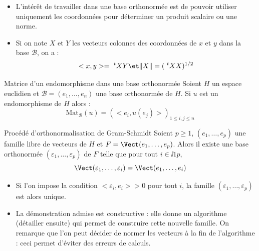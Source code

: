 \documentclass[french,11pt,twoside]{VcCours}
\begin{document}
\begin{Demonstration}{}
\vspace{4cm}
\end{Demonstration}

\begin{Remarques}{}
\begin{itemize} 
\item L'intérêt de travailler dans une base orthonormée est de pouvoir utiliser uniquement les coordonnées pour déterminer un produit scalaire ou une norme.
\item Si on note $X$ et $Y$ les vecteurs colonnes des coordonnées de $x$ et $y$ dans la base $\mathcal{B}$, on a :
$$ <x,y> = ~^tXY \et \Vert X \Vert = (~^tXX)^{1/2}$$
\end{itemize}
\end{Remarques}

\begin{Proposition}{Matrice d'un endomorphisme dans une base orthonormée}
Soient $H$ un espace euclidien et $\mathcal{B}=(e_1, \ldots, e_n)$ une base orthonormée de $H$. Si $u$ est un endomorphisme de $H$ alors :
$$ \textrm{Mat}_{\mathcal{B}}(u) = (<e_i, u(e_j)>)_{1 \leq i,j \leq n}$$
\end{Proposition}

\begin{Demonstration}{}
\vspace{6cm}
\end{Demonstration}


\begin{Theoreme}{Procédé d'orthonormalisation de Gram-Schmidt}
Soient $p \geq 1$, $(e_1, \ldots, e_p)$ une famille libre de vecteurs de $H$ et $F = \Vect(e_1, \ldots, e_p)$. Alors il existe une base orthonormée $(\varepsilon_1, \ldots, \varepsilon_p)$ de $F$ telle que pour tout $i \in \ii{1}{p}$,
$$ \Vect(\varepsilon_1, \ldots, \varepsilon_i) = \Vect(e_1, \ldots, e_i) $$
\end{Theoreme}
%

\begin{Remarques}{}
\begin{itemize}
\item Si l'on impose la condition $<\varepsilon_i, e_i>  >0$ pour tout $i$, la famille $(\varepsilon_1, \ldots, \varepsilon_p)$ est alors unique.
\item La démonstration admise est constructive : elle donne un algorithme (détailler ensuite) qui permet de construire cette nouvelle famille. On remarque que l'on peut décider de normer les vecteurs à la fin de l'algorithme : ceci permet d'éviter des erreurs de calculs.
\end{itemize}
\end{Remarques}
\end{document}
